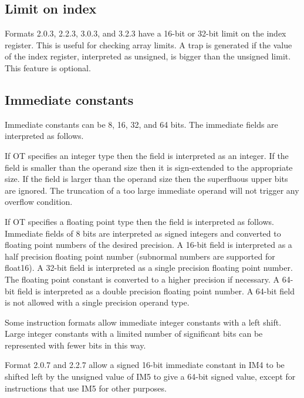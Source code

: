 \documentclass[forwardcom.tex]{subfiles}
\begin{document}

\subsection{Limit on index}
Formats 2.0.3, 2.2.3, 3.0.3, and 3.2.3 have a 16-bit or 32-bit limit on the index register. This is useful for checking array limits. A trap is generated if the value of the index register, interpreted as unsigned, is bigger than the unsigned limit. This feature is optional.
\vv 

\subsection{Immediate constants}
Immediate constants can be 8, 16, 32, and 64 bits. The immediate fields are interpreted as follows.
\vv

If OT specifies an integer type then the field is interpreted as an integer. If the field is smaller than the operand size then it is sign-extended to the appropriate size. If the field is larger than the operand size then the superfluous upper bits are ignored. The truncation of a too large immediate operand will not trigger any overflow condition.
\vv

If OT specifies a floating point type then the field is interpreted as follows. Immediate fields of 8 bits are interpreted as signed integers and converted to floating point numbers of the desired precision. A 16-bit field is interpreted as a half precision floating point number (subnormal numbers are supported for float16). 
A 32-bit field is interpreted as a single precision floating point number. The floating point constant is converted to a higher precision if necessary. A 64-bit field is interpreted as a double precision floating point number. A 64-bit field is not allowed with a single precision operand type.
\vv

Some instruction formats allow immediate integer constants with a left shift. Large integer constants with a limited number of significant bits can be represented with fewer bits in this way.
\vv

Format 2.0.7 and 2.2.7 allow a signed 16-bit immediate constant in IM4 to be shifted left by the unsigned value of IM5 to give a 64-bit signed value, except for instructions that use IM5 for other purposes.
\vv
\end{document}
